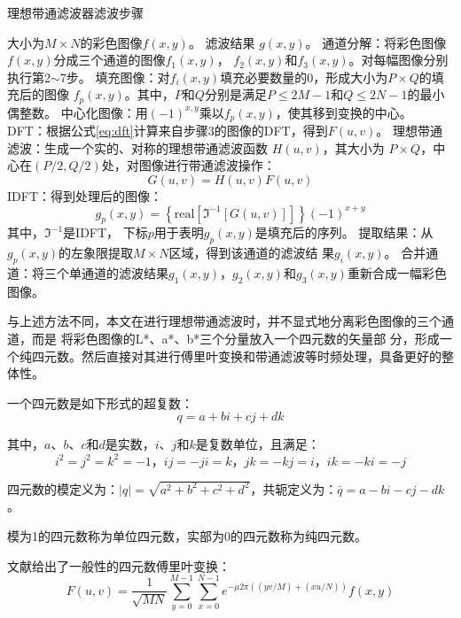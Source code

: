 \begin{algorithm}[htbp]
  \caption{理想带通滤波器滤波步骤}
  \label{alg:temporal-filter}
  \begin{algorithmic}[1]
    \REQUIRE 大小为$M\times N$的彩色图像$f(x,y)$。
    \ENSURE 滤波结果 $g(x,y)$。
    \STATE 通道分解：将彩色图像$f(x,y)$分成三个通道的图像$f_1(x,y)$，
    $f_2(x,y)$和$f_3(x,y)$。对每幅图像分别执行第2$\sim$7步。
    \STATE 填充图像：对$f_i(x,y)$填充必要数量的0，形成大小为$P\times Q$的填充后的图像
    $f_{p}(x,y)$。其中，$P$和$Q$分别是满足$P\le 2M-1$和$Q\le 2N-1$的最小偶整数。
    \STATE 中心化图像：用$(-1)^{x,y}$乘以$f_{p}(x,y)$，使其移到变换的中心。
    \STATE DFT：根据公式\ref{eq:dft}计算来自步骤3的图像的DFT，得到$F(u,v)$。
    \STATE 理想带通滤波：生成一个实的、对称的理想带通滤波函数 $H(u,v)$，其大小为
    $P\times Q$，中心在$(P/2, Q/2)$处，对图像进行带通滤波操作：$$G(u,v)=H(u,v)F(u,v)$$
    \STATE IDFT：得到处理后的图像：$$g_p(x,y)=\left\{
      \mbox{real}[\Im^{-1}[G(u,v)]] \right\}(-1)^{x+y}$$ 其中，$\Im^{-1}$是IDFT，
    下标$p$用于表明$g_p(x,y)$是填充后的序列。
    \STATE 提取结果：从$g_p(x,y)$的左象限提取$M\times N$区域，得到该通道的滤波结
    果$g_i(x,y)$。
    \STATE 合并通道：将三个单通道的滤波结果$g_1(x,y)$，$g_2(x,y)$和$g_3(x,y)$重新合成一幅彩色图像。
  \end{algorithmic}
\end{algorithm}

与上述方法不同，本文在进行理想带通滤波时，并不显式地分离彩色图像的三个通道，而是
将彩色图像的L*、a*、b*三个分量放入一个四元数的矢量部
分，形成一个纯四元数。然后直接对其进行傅里叶变换和带通滤波等时频处理，具备更好的整体性。

一个四元数是如下形式的超复数：
\begin{equation}
  \label{eq:quaternion}
  q=a+bi+cj+dk
\end{equation}

其中，$a$、$b$、$c$和$d$是实数，$i$、$j$和$k$是复数单位，且满足：
\begin{equation}
  \label{eq:ijk}
  i^2=j^2=k^2=-1\mbox{，}ij=-ji=k\mbox{，}jk=-kj=i\mbox{，}ik=-ki=-j
\end{equation}

四元数的模定义为：$\left|q\right|=\sqrt{a^2+b^2+c^2+d^2}$，共轭定义为：$\bar{q}=a-bi-cj-dk$。

模为1的四元数称为单位四元数，实部为0的四元数称为纯四元数。

文献\cite{sangwine2000discrete}给出了一般性的四元数傅里叶变换：
\begin{equation}
  \label{eq:quaternion-dft}
  F(u,v)=\frac{1}{\sqrt{MN}}\sum_{y=0}^{M-1}\sum_{x=0}^{N-1}e^{-\mu 2\pi((yv/M)+(xu/N))}f(x,y)
\end{equation}

